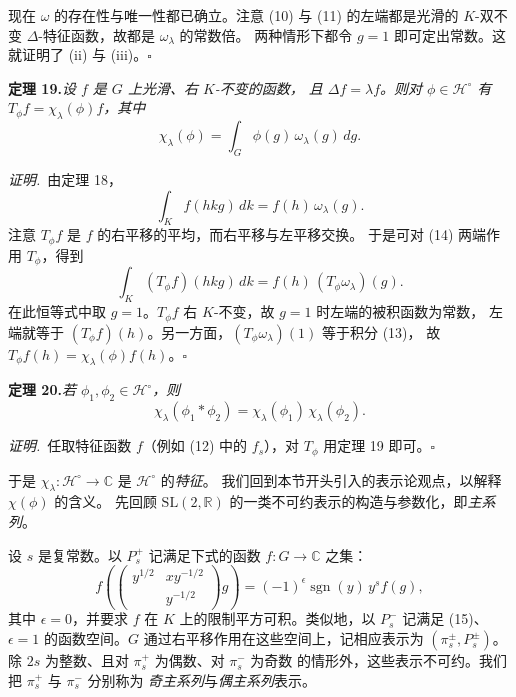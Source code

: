 现在 $\omega$ 的存在性与唯一性都已确立。注意 (10) 与 (11) 的左端都是光滑的
$K$-双不变 $\Delta$-特征函数，故都是 $\omega_{\lambda}$ 的常数倍。
两种情形下都令 $g=1$ 即可定出常数。这就证明了 (ii) 与 (iii)。\hfill$\square$

\par\medskip\noindent\textbf{定理 19.}\quad\emph{设 $f$ 是 $G$ 上光滑、右 $K$-不变的函数，
且 $\Delta f=\lambda f$。则对 $\phi\in\mathcal{H}^{\circ}$ 有 $T_{\phi}f=\chi_{\lambda}(\phi)f$，其中}
\begin{equation}\tag{13}
\chi_{\lambda}(\phi)=\int_{G}\phi(g)\,\omega_{\lambda}(g)\,dg .
\end{equation}

\smallskip
\noindent\emph{证明.}\ 由定理 18，
\begin{equation}\tag{14}
\int_{K}f(hkg)\,dk=f(h)\,\omega_{\lambda}(g).
\end{equation}
注意 $T_{\phi}f$ 是 $f$ 的右平移的平均，而右平移与左平移交换。
于是可对 (14) 两端作用 $T_{\phi}$，得到
\[
\int_{K}(T_{\phi}f)(hkg)\,dk=f(h)\,(T_{\phi}\omega_{\lambda})(g).
\]
在此恒等式中取 $g=1$。$T_{\phi}f$ 右 $K$-不变，故 $g=1$ 时左端的被积函数为常数，
左端就等于 $(T_{\phi}f)(h)$。另一方面，$(T_{\phi}\omega_{\lambda})(1)$ 等于积分 (13)，
故 $T_{\phi}f(h)=\chi_{\lambda}(\phi)f(h)$。\hfill$\square$

\par\medskip\noindent\textbf{定理 20.}\quad\emph{若 $\phi_{1},\phi_{2}\in\mathcal{H}^{\circ}$，则}
\[
\chi_{\lambda}(\phi_{1}*\phi_{2})=\chi_{\lambda}(\phi_{1})\,\chi_{\lambda}(\phi_{2}).
\]

\smallskip
\noindent\emph{证明.}\ 任取特征函数 $f$（例如 (12) 中的 $f_{s}$），对 $T_{\phi}$ 用定理 19
即可。\hfill$\square$

于是 $\chi_{\lambda}:\mathcal{H}^{\circ}\to\mathbb{C}$ 是 $\mathcal{H}^{\circ}$ 的\emph{特征}。
我们回到本节开头引入的表示论观点，以解释 $\chi(\phi)$ 的含义。
先回顾 $\mathrm{SL}(2,\mathbb{R})$ 的一类不可约表示的构造与参数化，即\emph{主系列}。

设 $s$ 是复常数。以 $P_{s}^{+}$ 记满足下式的函数 $f:G\to\mathbb{C}$ 之集：
\begin{equation}\tag{15}
f\!\left(\begin{pmatrix}y^{1/2}&xy^{-1/2}\\&y^{-1/2}\end{pmatrix}g\right)
=(-1)^{\epsilon}\operatorname{sgn}(y)\,y^{s}f(g),
\end{equation}
其中 $\epsilon=0$，并要求 $f$ 在 $K$ 上的限制平方可积。类似地，以 $P_{s}^{-}$ 记满足 (15)、
$\epsilon=1$ 的函数空间。$G$ 通过右平移作用在这些空间上，记相应表示为
$(\pi_{s}^{\pm},P_{s}^{\pm})$。除 $2s$ 为整数、且对 $\pi_{s}^{+}$ 为偶数、对 $\pi_{s}^{-}$ 为奇数
的情形外，这些表示不可约。我们把 $\pi_{s}^{+}$ 与 $\pi_{s}^{-}$ 分别称为
\emph{奇主系列}与\emph{偶主系列}表示。

